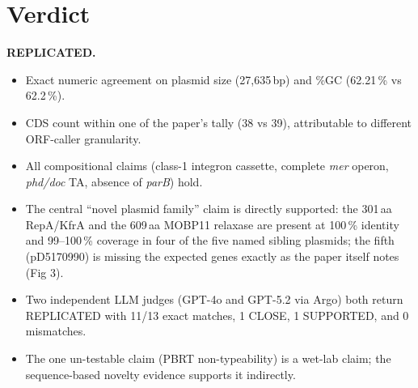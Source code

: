 \documentclass[11pt]{article}
\begin{document}
\section{Verdict}
\textbf{REPLICATED.}

\begin{itemize}[leftmargin=1.2em]
  \item Exact numeric agreement on plasmid size (27{,}635\,bp) and \%GC (62.21\,\% vs 62.2\,\%).
  \item CDS count within one of the paper's tally (38 vs 39), attributable to different
        ORF-caller granularity.
  \item All compositional claims (class-1 integron cassette, complete \textit{mer} operon,
        \textit{phd/doc} TA, absence of \textit{parB}) hold.
  \item The central ``novel plasmid family'' claim is directly supported: the 301\,aa
        RepA/KfrA and the 609\,aa MOBP11 relaxase are present at 100\,\% identity and
        99--100\,\% coverage in four of the five named sibling plasmids; the fifth
        (pD5170990) is missing the expected genes exactly as the paper itself notes (Fig 3).
  \item Two independent LLM judges (GPT-4o and GPT-5.2 via Argo) both return REPLICATED
        with 11/13 exact matches, 1 CLOSE, 1 SUPPORTED, and 0 mismatches.
  \item The one un-testable claim (PBRT non-typeability) is a wet-lab claim; the
        sequence-based novelty evidence supports it indirectly.
\end{itemize}

\begin{center}
\end{center}
\end{document}
